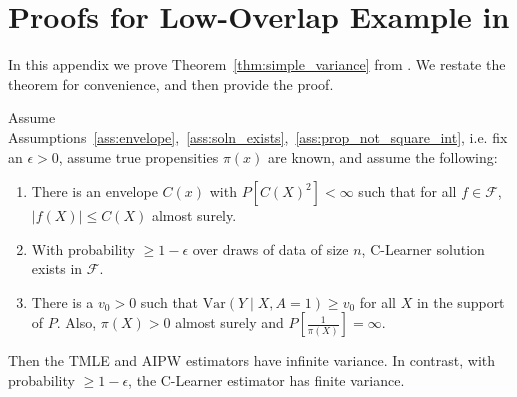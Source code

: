 \section{Proofs for Low-Overlap Example in }
\label{sec:theory_simple_more}
In this appendix we prove Theorem~\ref{thm:simple_variance} from . We restate the theorem for convenience, and then provide the proof. 
\begin{theorem}
Assume Assumptions~\ref{ass:envelope},~\ref{ass:soln_exists},~\ref{ass:prop_not_square_int}, 
i.e. fix an $\epsilon>0$, assume true propensities $\pi(x)$ are known, and assume the following:
\begin{enumerate}
    \item There is an envelope $C(x)$ with  $P[C(X)^2]<\infty$ such that for all $f\in \mathcal F$, $|f(X)|\leq C(X)$ almost surely. 
    \item With probability $\geq 1-\epsilon$ over draws of data of size $n$,  C-Learner solution exists in $\mathcal F$.
\item There is a $v_0>0$ such that 
$\text{Var}(Y\mid X, A=1)\geq v_0$
for all $X$ in the support of $P$. Also, $\pi(X)>0$ almost surely and
$P\left[\frac{1}{ \pi(X)}\right]=\infty$.
\end{enumerate}
Then the TMLE and AIPW estimators have infinite variance. In contrast, 
with probability $\geq 1-\epsilon$,
the C-Learner estimator has finite variance. 
\end{theorem}
